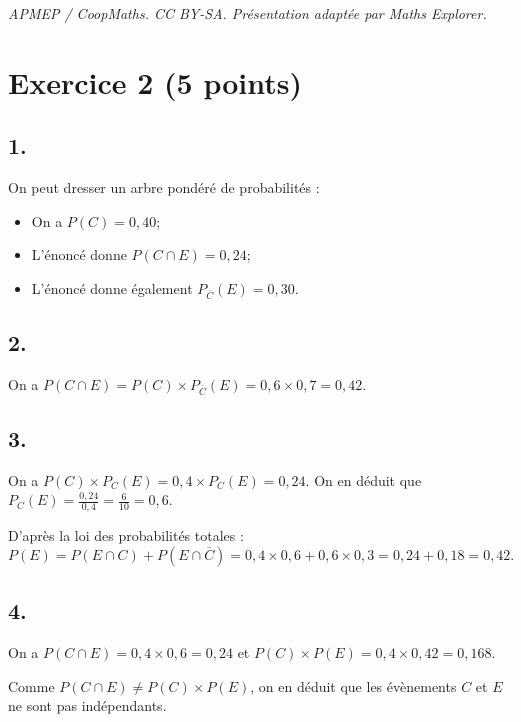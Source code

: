\documentclass[10pt]{article}
\begin{document}
\noindent\textit{APMEP / CoopMaths. CC BY-SA. Présentation adaptée par Maths Explorer.}\par\medskip
\section*{Exercice 2 (5 points)}
	

	\subsection*{1.}
	On peut dresser un arbre pondéré de probabilités :
	


	
	
	\begin{itemize}
		\item On a  $P(C) = 0,40$; 
		\item L’énoncé donne  $P(C \cap E) = 0,24$; 
		\item  L’énoncé donne également $ P_{\overline{C}}(E)= 0,30$.
	\end{itemize}
	
	
	\subsection*{2.}
	On a $P(C \cap E) = P(C) \times P_{\overline{C}}(E) = 0,6 \times 0,7 = 0,42$.
	
	\subsection*{3.}
	On a $P(C) \times P_C(E)= 0,4 \times P_C(E)= 0,24$. On en déduit que $P_C(E) = \frac{0,24}{0,4} = \frac{6}{10} = 0,6$.
	
	D’après la loi des probabilités totales :
	\[
	P(E) = P(E \cap C) + P(E \cap \overline{C}) = 0,4 \times 0,6 + 0,6 \times 0,3 = 0,24 + 0,18 = 0,42.
	\]
	
	\subsection*{4.}
	On a $P(C \cap E) = 0,4 \times 0,6 = 0,24$ et $P(C) \times P(E) = 0,4 \times 0,42 = 0,168$.
	
	Comme $P(C \cap E) \neq P(C) \times P(E)$, on en déduit que les évènements $C$ et $E$ ne sont pas indépendants.
\end{document}
